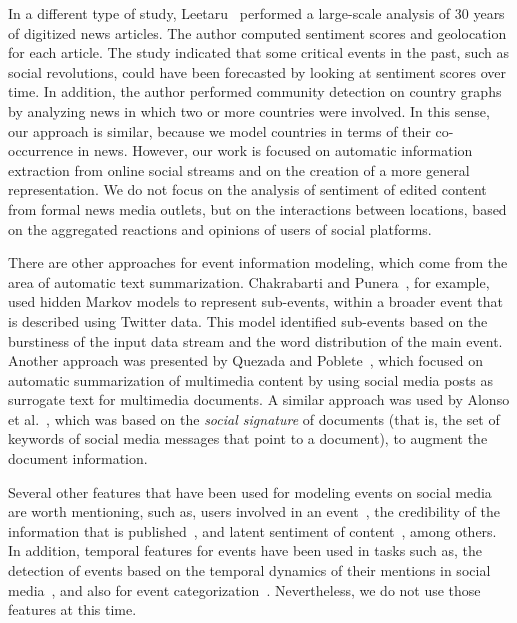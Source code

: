 In a different type of study, Leetaru~\cite{leetaru2011culturomics}
performed a large-scale
analysis of 30
years of digitized news articles.  The author computed sentiment scores and
geolocation for each article.  The study indicated that some critical events
in the past, such as social revolutions, could have been forecasted by
looking at sentiment scores over time.  In addition, the author performed
community detection on country graphs by analyzing news in
which two or more countries were involved.  In this sense, our approach is
similar, because we model countries in terms of their co-occurrence in news.
However, our work is focused on automatic information extraction from online
social streams and on the creation of a more general representation.  We do
not focus on the analysis of sentiment of edited content from
formal news media outlets, but
on the interactions between locations, based on the aggregated reactions and opinions
of users of social platforms.

There are other approaches for event information modeling, which come from
the area of automatic text summarization. Chakrabarti and Punera~\cite{ICWSM112885},
for example, used hidden Markov models to represent sub-events, within a
broader event that is described using Twitter data. This model identified
sub-events based on the burstiness of the input data stream and the word
distribution of the main event. Another approach was presented
by Quezada and Poblete~\cite{quezada2013understanding}, which focused on automatic
summarization of multimedia content by using social media posts as surrogate
text for multimedia documents. A similar approach was used by Alonso et al.~\cite{Alonso:2015:WCW:2740908.2745397},
which was based on the \emph{social signature} of documents (that is, the set of keywords
of social media messages that point to a document), to augment the
document information.

Several other features that have been used for modeling
events on social media are worth mentioning, such as, users
involved in an event~\cite{Wang:LeadLine:2012}, the credibility of the information
that is published~\cite{Castillo:Information:2011}, and latent sentiment of
content~\cite{Wang:2012:SRT:2390470.2390490}, among others.
In addition, temporal features for events have been used in tasks such as,
the detection of events based on the temporal dynamics of their mentions
in social media~\cite{DBLP:journals/corr/GuilleF15}, and
also for event categorization~\cite{Ritter:2012:ODE:2339530.2339704}.
Nevertheless, we do not use those features at this time.

